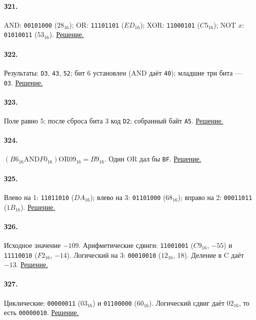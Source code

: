 \paragraph*{З21.}\label{ans:z21}
AND: \texttt{00101000} ($28_{16}$); OR: \texttt{11101101} ($ED_{16}$); XOR: \texttt{11000101} ($C5_{16}$); NOT $x$: \texttt{01010011} ($53_{16}$).
\hyperref[sol:z21]{Решение.}

\paragraph*{З22.}\label{ans:z22}
Результаты: \texttt{D3}, \texttt{43}, \texttt{52}; бит 6 установлен (AND даёт \texttt{40}); младшие три бита --- \texttt{03}.
\hyperref[sol:z22]{Решение.}

\paragraph*{З23.}\label{ans:z23}
Поле равно 5; после сброса бита 3 код \texttt{D2}; собранный байт \texttt{A5}.
\hyperref[sol:z23]{Решение.}

\paragraph*{З24.}\label{ans:z24}
$(B6_{16}\mathbin{\mathrm{AND}}F0_{16})\mathbin{\mathrm{OR}}09_{16}=B9_{16}$. Один OR дал бы \texttt{BF}.
\hyperref[sol:z24]{Решение.}

\paragraph*{З25.}\label{ans:z25}
Влево на 1: \texttt{11011010} ($DA_{16}$); влево на 3: \texttt{01101000} ($68_{16}$); вправо на 2: \texttt{00011011} ($1B_{16}$).
\hyperref[sol:z25]{Решение.}

\paragraph*{З26.}\label{ans:z26}
Исходное значение $-109$. Арифметические сдвиги: \texttt{11001001} ($C9_{16}$, $-55$) и \texttt{11110010} ($F2_{16}$, $-14$). Логический на 3: \texttt{00010010} ($12_{16}$, 18). Деление в C даёт $-13$.
\hyperref[sol:z26]{Решение.}

\paragraph*{З27.}\label{ans:z27}
Циклические: \texttt{00000011} ($03_{16}$) и \texttt{01100000} ($60_{16}$).
Логический сдвиг даёт $02_{16}$, то есть \texttt{00000010}.
\hyperref[sol:z27]{Решение.}

